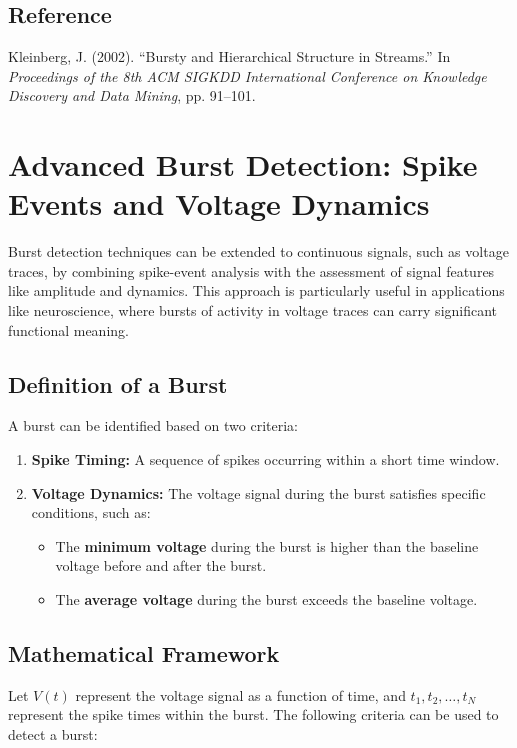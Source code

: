 \documentclass[a4paper,9pt]{extarticle}
\begin{document}
\subsection{Reference}
Kleinberg, J. (2002). ``Bursty and Hierarchical Structure in Streams.'' In \emph{Proceedings of the 8th ACM SIGKDD International Conference on Knowledge Discovery and Data Mining}, pp. 91--101.

\section{Advanced Burst Detection: Spike Events and Voltage Dynamics}

Burst detection techniques can be extended to continuous signals, such as voltage traces, by combining spike-event analysis with the assessment of signal features like amplitude and dynamics. This approach is particularly useful in applications like neuroscience, where bursts of activity in voltage traces can carry significant functional meaning.

\subsection{Definition of a Burst}
A burst can be identified based on two criteria:
\begin{enumerate}
    \item \textbf{Spike Timing:} A sequence of spikes occurring within a short time window.
    \item \textbf{Voltage Dynamics:} The voltage signal during the burst satisfies specific conditions, such as:
    \begin{itemize}
        \item The \textbf{minimum voltage} during the burst is higher than the baseline voltage before and after the burst.
        \item The \textbf{average voltage} during the burst exceeds the baseline voltage.
    \end{itemize}
\end{enumerate}

\subsection{Mathematical Framework}
Let $V(t)$ represent the voltage signal as a function of time, and $t_1, t_2, \dots, t_N$ represent the spike times within the burst. The following criteria can be used to detect a burst:
\end{document}

